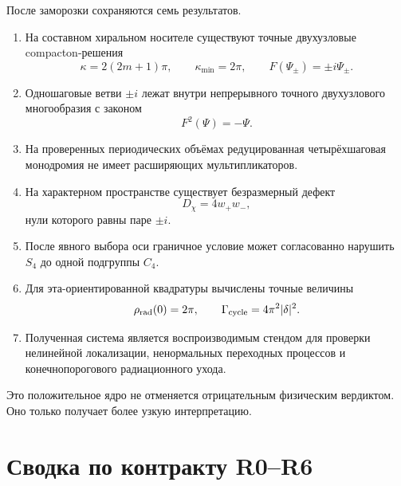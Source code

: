 После заморозки сохраняются семь результатов.
\begin{enumerate}
 \item На составном хиральном носителе существуют точные двухузловые
 compacton-решения
 \begin{equation}
  \kappa=2(2m+1)\pi,
  \qquad \kappa_{\min}=2\pi,
  \qquad F(\Psi_\pm)=\pm i\Psi_\pm.
 \end{equation}
 \item Одношаговые ветви $\pm i$ лежат внутри непрерывного точного
 двухузлового многообразия с законом
 \begin{equation}
  F^2(\Psi)=-\Psi.
 \end{equation}
 \item На проверенных периодических объёмах редуцированная
 четырёхшаговая монодромия не имеет расширяющих мультипликаторов.
 \item На характерном пространстве существует безразмерный дефект
 \begin{equation}
  D_\chi=4w_+w_-,
 \end{equation}
 нули которого равны паре $\pm i$.
 \item После явного выбора оси граничное условие может согласованно
 нарушить $S_4$ до одной подгруппы $C_4$.
 \item Для эта-ориентированной квадратуры вычислены точные величины
 \begin{equation}
  \rho_{\rm rad}(0)=2\pi,
  \qquad \Gamma_{\rm cycle}=4\pi^2|\delta|^2.
 \end{equation}
 \item Полученная система является воспроизводимым стендом для проверки
 нелинейной локализации, ненормальных переходных процессов и
 конечнопорогового радиационного ухода.
\end{enumerate}

Это положительное ядро не отменяется отрицательным физическим вердиктом.
Оно только получает более узкую интерпретацию.

\section{Сводка по контракту R0--R6}

